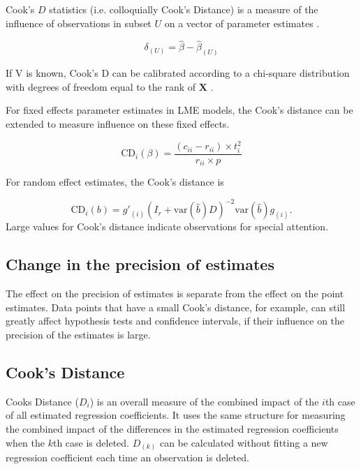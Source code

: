 \documentclass[Main.tex]{subfiles}
\begin{document}
	
	 Cook's $D$ statistics (i.e. colloquially Cook's Distance) is a measure of the influence of observations in subset $U$ on a vector of parameter estimates \citep{cook77}.
	
	
	\[ \delta_{(U)} = \hat{\beta} - \hat{\beta}_{(U)}\]
	
	
	If V is known, Cook's D can be calibrated according to a chi-square distribution with degrees of freedom equal to the rank of $\boldsymbol{X}$ \citep{cpj92}.
	

	
	
	
	For fixed effects parameter estimates in LME models, the  Cook's distance can be extended to measure influence on these fixed effects.
	
	
	\[
	\mbox{CD}_{i}(\beta) = \frac{(c_{ii} - r_{ii}) \times t^2_{i}}{r_{ii} \times p}
	\]
	
	
	For random effect estimates, the  Cook's distance is
	
	
	\[
	\mbox{CD}_{i}(b) = g{\prime}_{(i)} (I_{r} + \mbox{var}(\hat{b})D)^{-2}\mbox{var}(\hat{b})g_{(i)}.
	\]
	Large values for Cook's distance indicate observations for special attention.
	
	\subsection{Change in the precision of estimates}
	
	The effect on the precision of estimates is separate from the effect on the point estimates. Data points that
	have a small Cook's distance, for example, can still greatly affect hypothesis tests and confidence intervals, if their  influence on the precision of the estimates is large.
	
	
	
	\subsection{Cook's Distance}%
	Cooks Distance ($D_{i}$) is an overall measure of the combined impact of the $i$th case of all estimated regression coefficients. It uses the same structure for measuring the combined impact of the differences in the estimated regression coefficients when the $k$th case is deleted. $D_{(k)}$ can be calculated without fitting
	a new regression coefficient each time an observation is deleted.
	
\end{document}
